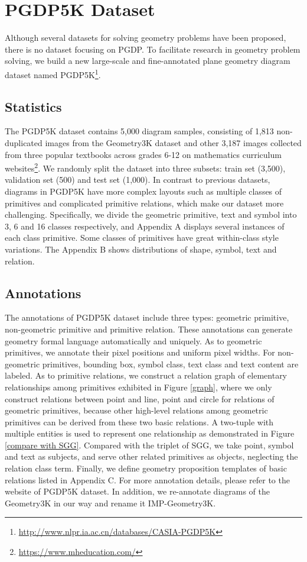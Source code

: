 \documentclass{article}
\begin{document}
\section{PGDP5K Dataset}
Although several datasets \cite{Seo2015,Sachan2017,Lu2021,Chen2021} for solving geometry problems have been proposed, there is no dataset focusing on PGDP. To facilitate research in geometry problem solving, we build a new large-scale and fine-annotated plane geometry diagram dataset named PGDP5K\footnote{ \url{http://www.nlpr.ia.ac.cn/databases/CASIA-PGDP5K}}.
  
\subsection{Statistics} 
The PGDP5K dataset contains 5,000 diagram samples, consisting of 1,813 non-duplicated images from the Geometry3K dataset and other 3,187 images collected from three popular textbooks across grades 6-12 on mathematics curriculum websites\footnote{\url{https://www.mheducation.com/}}. We randomly split the dataset into three subsets: train set (3,500), validation set (500) and test set (1,000). In contrast to previous datasets, diagrams in PGDP5K have more complex layouts such as multiple classes of primitives and complicated primitive relations, which make our dataset more challenging. Specifically, we divide the geometric primitive, text and symbol into 3, 6 and 16 classes respectively, and Appendix A displays several instances of each class primitive. Some classes of primitives have great within-class style variations. The Appendix B shows distributions of shape, symbol, text and relation. 

\subsection{Annotations} 
The annotations of PGDP5K dataset include three types: geometric primitive, non-geometric primitive and primitive relation. These annotations can generate geometry formal language automatically and uniquely. As to geometric primitives, we annotate their pixel positions and uniform pixel widths. For non-geometric primitives, bounding box, symbol class, text class and text content are labeled. As to primitive relations, we construct a relation graph of elementary relationships among primitives exhibited in Figure \ref{graph}, where we only construct relations between point and line, point and circle for relations of geometric primitives, because other high-level relations among geometric primitives can be derived from these two basic relations. A two-tuple with multiple entities is used to represent one relationship as demonstrated in Figure \ref{compare with SGG}. Compared with the triplet of SGG, we take point, symbol and text as subjects, and serve other related primitives as objects, neglecting the relation class term. Finally, we define geometry proposition templates of basic relations listed in Appendix C. For more annotation details, please refer to the website of PGDP5K dataset. In addition, we re-annotate diagrams of the Geometry3K in our way and rename it IMP-Geometry3K.
\end{document}
